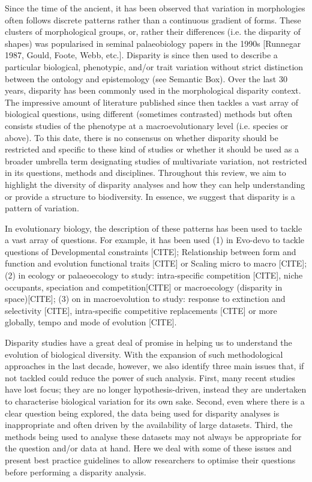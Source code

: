 \documentclass[12pt,letterpaper]{article}
\begin{document}
Since the time of the ancient, it has been observed that variation in morphologies often follows discrete patterns rather than a continuous gradient of forms.
These clusters of morphological groups, or, rather their differences (i.e. the disparity of shapes) was popularised in seminal palaeobiology papers in the 1990s [Runnegar 1987, Gould, Foote, Webb, etc.].
Disparity is since then used to describe a particular biological, phenotypic, and/or trait variation without strict distinction between the ontology and epistemology (see Semantic Box).
Over the last 30 years, disparity has been commonly used in the morphological disparity context.
The impressive amount of literature published since then tackles a vast array of biological questions, using different (sometimes contrasted) methods but often consists studies of the phenotype at a macroevolutionary level (i.e. species or above).
To this date, there is no consensus on whether disparity should be restricted and specific to these kind of studies or whether it should be used as a broader umbrella term designating studies of multivariate variation, not restricted in its questions, methods and disciplines.
Throughout this review, we aim to highlight the diversity of disparity analyses and how they can help understanding or provide a structure to biodiversity.
In essence, we suggest that disparity is a pattern of variation.

In evolutionary biology, the description of these patterns has been used to tackle a vast array of questions.
For example, it has been used (1) in Evo-devo to tackle questions of
Developmental constraints [CITE];
Relationship between form and function and evolution functional traits [CITE] or
Scaling micro to macro [CITE];
(2) in ecology or palaeoecology to study:
intra-specific competition [CITE],
niche occupants, speciation and competition[CITE] or
macroecology (disparity in space)[CITE];
(3) on in macroevolution to study:
response to extinction and selectivity [CITE],
intra-specific competitive replacements [CITE] or
more globally, tempo and mode of evolution [CITE].

Disparity studies have a great deal of promise in helping us to understand the evolution of biological diversity.
With the expansion of such methodological approaches in the last decade, however, we also identify three main issues that, if not tackled could reduce the power of such analysis.
First, many recent studies have lost focus; they are no longer hypothesis-driven, instead they are undertaken to characterise biological variation for its own sake.
Second, even where there is a clear question being explored, the data being used for disparity analyses is inappropriate and often driven by the availability of large datasets.
Third, the methods being used to analyse these datasets may not always be appropriate for the question and/or data at hand.
Here we deal with some of these issues and present best practice guidelines to allow researchers to optimise their questions before performing a disparity analysis.
\end{document}
